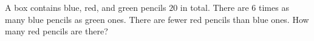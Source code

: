 A box contains blue, red, and green pencils $20$ in total. There are $6$ times as many blue pencils as green ones. There are fewer red pencils than blue ones. How many red pencils are there?
